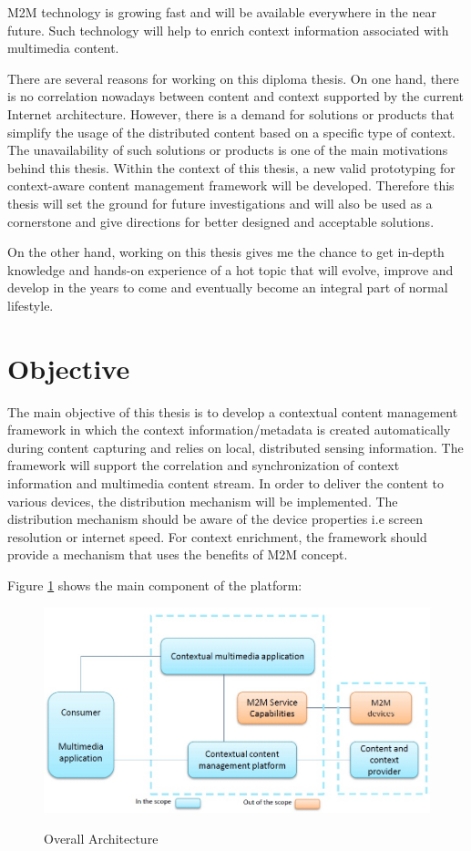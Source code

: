 \ac{M2M} technology is growing fast and  will be available everywhere in the near future. Such technology will help to enrich context information associated with multimedia content.

There are several reasons for working on this diploma thesis. On one hand, there is no correlation nowadays between content and context supported by the current Internet architecture. However, there is a demand for solutions or products that simplify the usage of the distributed content based on a specific type of context. The unavailability of such solutions or products is one of the main motivations behind this thesis. Within the context of this thesis, a new valid prototyping for context-aware content management framework will be developed. Therefore this thesis will set the ground for future investigations and will also be used as a cornerstone and give directions for better designed and acceptable solutions.

On the other hand, working on this thesis gives me the chance to get in-depth knowledge and hands-on experience of a hot topic that will evolve, improve and develop in the years to come and eventually become an integral part of normal lifestyle.

\section{Objective\label{sec:objective}}

The main objective of this thesis is to develop a contextual content management framework in which the context information/metadata is created automatically during content capturing and relies on local, distributed sensing information. The framework will support the correlation and synchronization of context information and multimedia content stream. In order to deliver the content to various devices, the distribution mechanism will be implemented. The distribution mechanism should be aware of the device properties i.e screen resolution or internet speed. For context enrichment, the framework should provide a mechanism that uses the benefits of \ac{M2M} concept.

Figure \ref{fig:oarch} shows the main component of the platform:
\begin{figure}[htb]
  \centering
  \includegraphics[scale=0.5]{DA-OverallArchitecture.jpg}\\
  \caption{Overall Architecture}
  \label{fig:oarch}
\end{figure}



